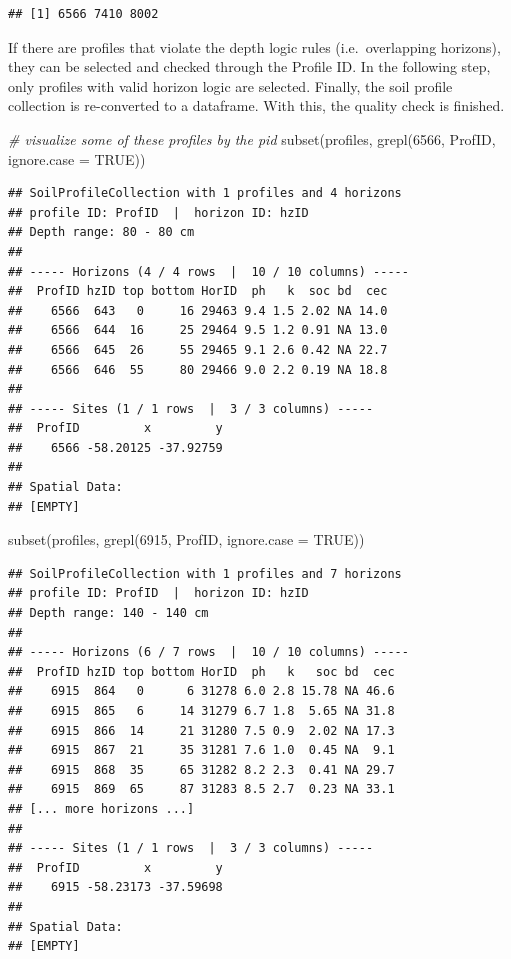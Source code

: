 \documentclass[
  10pt,
  b5paper,
  oneside]{book}
\newenvironment{Shaded}{\begin{snugshade}}{\end{snugshade}}
\newcommand{\AttributeTok}[1]{\textcolor[rgb]{0.77,0.63,0.00}{#1}}
\newcommand{\CommentTok}[1]{\textcolor[rgb]{0.56,0.35,0.01}{\textit{#1}}}
\newcommand{\ConstantTok}[1]{\textcolor[rgb]{0.00,0.00,0.00}{#1}}
\newcommand{\DecValTok}[1]{\textcolor[rgb]{0.00,0.00,0.81}{#1}}
\newcommand{\FunctionTok}[1]{\textcolor[rgb]{0.00,0.00,0.00}{#1}}
\newcommand{\NormalTok}[1]{#1}
\begin{document}
\begin{verbatim}
## [1] 6566 7410 8002
\end{verbatim}

If there are profiles that violate the depth logic rules (i.e.~overlapping horizons), they can be selected and checked through the Profile ID. In the following step, only profiles with valid horizon logic are selected. Finally, the soil profile collection is re-converted to a dataframe. With this, the quality check is finished.

\begin{Shaded}
\begin{Highlighting}[]
\CommentTok{\# visualize some of these profiles by the pid}
\FunctionTok{subset}\NormalTok{(profiles, }\FunctionTok{grepl}\NormalTok{(}\DecValTok{6566}\NormalTok{, ProfID, }\AttributeTok{ignore.case =} \ConstantTok{TRUE}\NormalTok{))}
\end{Highlighting}
\end{Shaded}

\begin{verbatim}
## SoilProfileCollection with 1 profiles and 4 horizons
## profile ID: ProfID  |  horizon ID: hzID 
## Depth range: 80 - 80 cm
## 
## ----- Horizons (4 / 4 rows  |  10 / 10 columns) -----
##  ProfID hzID top bottom HorID  ph   k  soc bd  cec
##    6566  643   0     16 29463 9.4 1.5 2.02 NA 14.0
##    6566  644  16     25 29464 9.5 1.2 0.91 NA 13.0
##    6566  645  26     55 29465 9.1 2.6 0.42 NA 22.7
##    6566  646  55     80 29466 9.0 2.2 0.19 NA 18.8
## 
## ----- Sites (1 / 1 rows  |  3 / 3 columns) -----
##  ProfID         x         y
##    6566 -58.20125 -37.92759
## 
## Spatial Data:
## [EMPTY]
\end{verbatim}

\begin{Shaded}
\begin{Highlighting}[]
\FunctionTok{subset}\NormalTok{(profiles, }\FunctionTok{grepl}\NormalTok{(}\DecValTok{6915}\NormalTok{, ProfID, }\AttributeTok{ignore.case =} \ConstantTok{TRUE}\NormalTok{))}
\end{Highlighting}
\end{Shaded}

\begin{verbatim}
## SoilProfileCollection with 1 profiles and 7 horizons
## profile ID: ProfID  |  horizon ID: hzID 
## Depth range: 140 - 140 cm
## 
## ----- Horizons (6 / 7 rows  |  10 / 10 columns) -----
##  ProfID hzID top bottom HorID  ph   k   soc bd  cec
##    6915  864   0      6 31278 6.0 2.8 15.78 NA 46.6
##    6915  865   6     14 31279 6.7 1.8  5.65 NA 31.8
##    6915  866  14     21 31280 7.5 0.9  2.02 NA 17.3
##    6915  867  21     35 31281 7.6 1.0  0.45 NA  9.1
##    6915  868  35     65 31282 8.2 2.3  0.41 NA 29.7
##    6915  869  65     87 31283 8.5 2.7  0.23 NA 33.1
## [... more horizons ...]
## 
## ----- Sites (1 / 1 rows  |  3 / 3 columns) -----
##  ProfID         x         y
##    6915 -58.23173 -37.59698
## 
## Spatial Data:
## [EMPTY]
\end{verbatim}
\end{document}
